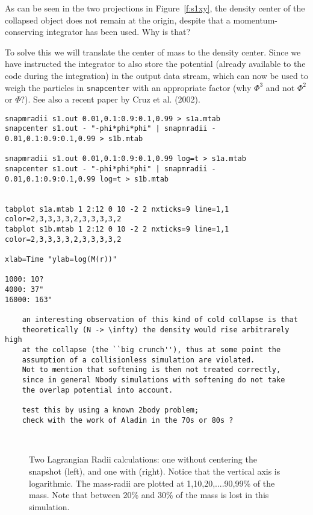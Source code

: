 As can be seen in the two projections in Figure~\ref{f:s1xy}, the density center
of the collapsed object does not remain at the origin, despite that a 
momentum-conserving integrator has been used. Why is that?

To solve this we will translate the center of mass to the density center. Since
we have instructed the integrator to also store the potential (already
available to the code during the integration) in the output data stream, which
can now be used to weigh the particles in {\tt snapcenter} with an appropriate
factor (why $\Phi^3$ and not $\Phi^2$ or $\Phi$?). See also  a recent
paper by Cruz et al. (2002).

\footnotesize\begin{verbatim}
snapmradii s1.out 0.01,0.1:0.9:0.1,0.99 > s1a.mtab
snapcenter s1.out - "-phi*phi*phi" | snapmradii - 0.01,0.1:0.9:0.1,0.99 > s1b.mtab

snapmradii s1.out 0.01,0.1:0.9:0.1,0.99 log=t > s1a.mtab
snapcenter s1.out - "-phi*phi*phi" | snapmradii - 0.01,0.1:0.9:0.1,0.99 log=t > s1b.mtab


tabplot s1a.mtab 1 2:12 0 10 -2 2 nxticks=9 line=1,1 color=2,3,3,3,3,2,3,3,3,3,2
tabplot s1b.mtab 1 2:12 0 10 -2 2 nxticks=9 line=1,1 color=2,3,3,3,3,2,3,3,3,3,2

xlab=Time "ylab=log(M(r))"

1000: 10?
4000: 37"
16000: 163"

    an interesting observation of this kind of cold collapse is that
    theoretically (N -> \infty) the density would rise arbitrarely high
    at the collapse (the ``big crunch''), thus at some point the
    assumption of a collisionless simulation are violated.
    Not to mention that softening is then not treated correctly,
    since in general Nbody simulations with softening do not take
    the overlap potential into account.

    test this by using a known 2body problem; 
    check with the work of Aladin in the 70s or 80s ?



\end{verbatim}\normalsize

\begin{figure}[htb]
\caption[Lagrangian Radii for a Cold Collapse]
{Two Lagrangian Radii calculations: one without centering the
snapshot (left), and one with (right). Notice that the vertical axis is
logarithmic. The mass-radii are plotted at
1,10,20,....90,99\% of the mass. Note that between 20\% and 30\% of the
mass is lost in this simulation.}
\end{figure}




